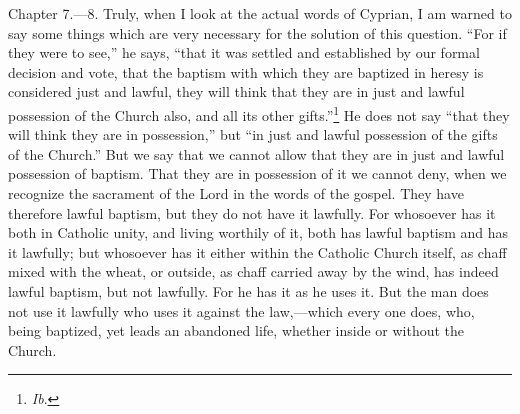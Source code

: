 Chapter 7.—8. Truly, when I look at the actual words of Cyprian, I am warned to say some things which are very necessary for the solution of this question. ``For if they were to see,'' he says, ``that it was settled and established by our formal decision and vote, that the baptism with which they are baptized in heresy is considered just and lawful, they will think that they are in just and lawful possession of the Church also, and all its other gifts.''\footnote{\par  \emph{Ib}.} He does not say ``that they will think they are in possession,'' but ``in just and lawful possession of the gifts of the Church.'' But we say that we cannot allow that they are in just and lawful possession of baptism. That they are in possession of it we cannot deny, when we recognize the sacrament of the Lord in the words of the gospel. They have therefore lawful baptism, but they do not have it lawfully. For whosoever has it both in Catholic unity, and living worthily of it, both has lawful baptism and has it lawfully; but whosoever has it either within the Catholic Church itself, as chaff mixed with the wheat, or outside, as chaff carried away by the wind, has indeed lawful baptism, but not lawfully. For he has it as he uses it. But the man does not use it lawfully who uses it against the law,—which every one does, who, being baptized, yet leads an abandoned life, whether inside or without the Church.


